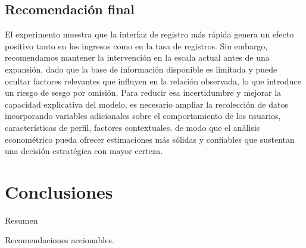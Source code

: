 \documentclass[conference]{IEEEtran}
\begin{document}
\subsection{Recomendación final}


El experimento muestra que la interfaz de registro más rápida genera un efecto positivo tanto en los ingresos como en la tasa de registros. Sin embargo, recomendamos mantener la intervención en la escala actual antes de una expansión, dado que la base de información disponible es limitada y puede ocultar factores relevantes que influyen en la relación observada, lo que introduce un riesgo de sesgo por omisión. Para reducir esa incertidumbre y mejorar la capacidad explicativa del modelo, es necesario ampliar la recolección de datos incorporando variables adicionales sobre el comportamiento de los usuarios, características de perfil, factores contextuales. de modo que el análisis econométrico pueda ofrecer estimaciones más sólidas y confiables que sustentan una decisión estratégica con mayor certeza.





\section{Conclusiones}

Resumen 

Recomendaciones accionables.
\end{document}

